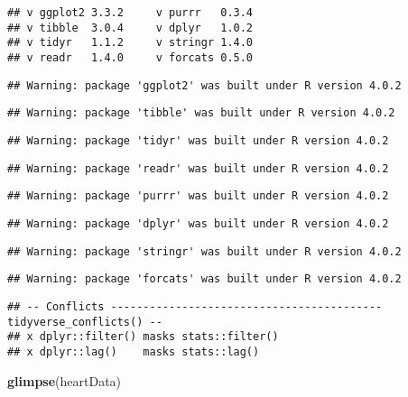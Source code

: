 \documentclass[
]{article}
\newenvironment{Shaded}{\begin{snugshade}}{\end{snugshade}}
\newcommand{\KeywordTok}[1]{\textcolor[rgb]{0.13,0.29,0.53}{\textbf{#1}}}
\newcommand{\NormalTok}[1]{#1}
\begin{document}
\begin{verbatim}
## v ggplot2 3.3.2     v purrr   0.3.4
## v tibble  3.0.4     v dplyr   1.0.2
## v tidyr   1.1.2     v stringr 1.4.0
## v readr   1.4.0     v forcats 0.5.0
\end{verbatim}

\begin{verbatim}
## Warning: package 'ggplot2' was built under R version 4.0.2
\end{verbatim}

\begin{verbatim}
## Warning: package 'tibble' was built under R version 4.0.2
\end{verbatim}

\begin{verbatim}
## Warning: package 'tidyr' was built under R version 4.0.2
\end{verbatim}

\begin{verbatim}
## Warning: package 'readr' was built under R version 4.0.2
\end{verbatim}

\begin{verbatim}
## Warning: package 'purrr' was built under R version 4.0.2
\end{verbatim}

\begin{verbatim}
## Warning: package 'dplyr' was built under R version 4.0.2
\end{verbatim}

\begin{verbatim}
## Warning: package 'stringr' was built under R version 4.0.2
\end{verbatim}

\begin{verbatim}
## Warning: package 'forcats' was built under R version 4.0.2
\end{verbatim}

\begin{verbatim}
## -- Conflicts ------------------------------------------ tidyverse_conflicts() --
## x dplyr::filter() masks stats::filter()
## x dplyr::lag()    masks stats::lag()
\end{verbatim}

\begin{Shaded}
\begin{Highlighting}[]
\KeywordTok{glimpse}\NormalTok{(heartData)}
\end{Highlighting}
\end{Shaded}
\end{document}

